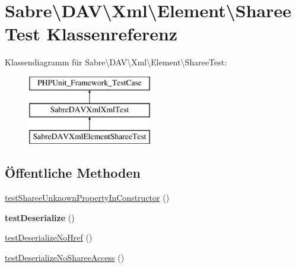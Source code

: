 \hypertarget{class_sabre_1_1_d_a_v_1_1_xml_1_1_element_1_1_sharee_test}{}\section{Sabre\textbackslash{}D\+AV\textbackslash{}Xml\textbackslash{}Element\textbackslash{}Sharee\+Test Klassenreferenz}
\label{class_sabre_1_1_d_a_v_1_1_xml_1_1_element_1_1_sharee_test}
Klassendiagramm für Sabre\textbackslash{}D\+AV\textbackslash{}Xml\textbackslash{}Element\textbackslash{}Sharee\+Test\+:\begin{figure}[H]
\begin{center}
\leavevmode
\includegraphics[height=3.000000cm]{class_sabre_1_1_d_a_v_1_1_xml_1_1_element_1_1_sharee_test}
\end{center}
\end{figure}
\subsection*{Öffentliche Methoden}
\begin{DoxyCompactItemize}
\item 
\mbox{\hyperlink{class_sabre_1_1_d_a_v_1_1_xml_1_1_element_1_1_sharee_test_ab0365923b667b3d8addc3da871885081}{test\+Sharee\+Unknown\+Property\+In\+Constructor}} ()
\item 
\mbox{\label{class_sabre_1_1_d_a_v_1_1_xml_1_1_element_1_1_sharee_test_aee525e4936df8fab51d156d5123ba8f9}} 
{\bfseries test\+Deserialize} ()
\item 
\mbox{\hyperlink{class_sabre_1_1_d_a_v_1_1_xml_1_1_element_1_1_sharee_test_a85a4be20d894e468b7dfbed2d54cb135}{test\+Deserialize\+No\+Href}} ()
\item 
\mbox{\hyperlink{class_sabre_1_1_d_a_v_1_1_xml_1_1_element_1_1_sharee_test_ad87dd887b53854cc9ac505a3c91e77f1}{test\+Deserialize\+No\+Sharee\+Access}} ()
\end{DoxyCompactItemize}
